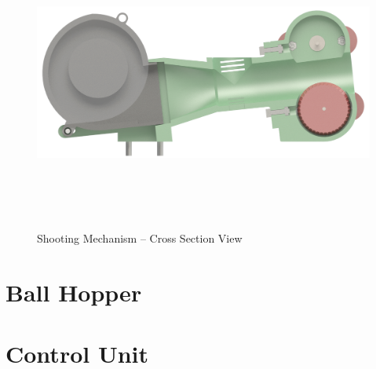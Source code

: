\begin{figure}[H]   %
	\centering \includegraphics[width=6in, height=3.85in, keepaspectratio]{figures/shooter_xsec.png}
	\caption{Shooting Mechanism -- Cross Section View}	\label{fig:shooter_xsec}
\end{figure}




\section{Ball Hopper}

\section{Control Unit}